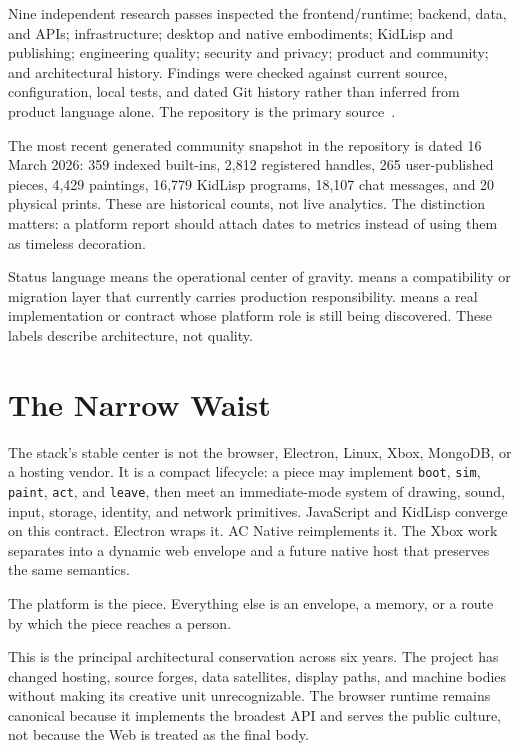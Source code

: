 \documentclass[10pt,letterpaper,twocolumn]{article}
\begin{document}
Nine independent research passes inspected the frontend/runtime; backend, data, and APIs; infrastructure; desktop and native embodiments; KidLisp and publishing; engineering quality; security and privacy; product and community; and architectural history. Findings were checked against current source, configuration, local tests, and dated Git history rather than inferred from product language alone. The repository is the primary source~\citep{acrepo2026}.

The most recent generated community snapshot in the repository is dated 16 March 2026: 359 indexed built-ins, 2,812 registered handles, 265 user-published pieces, 4,429 paintings, 16,779 KidLisp programs, 18,107 chat messages, and 20 physical prints. These are historical counts, not live analytics. The distinction matters: a platform report should attach dates to metrics instead of using them as timeless decoration.

\begin{stackfinding}{Status language}
\canonical{} means the operational center of gravity. \transitional{} means a compatibility or migration layer that currently carries production responsibility. \experimental{} means a real implementation or contract whose platform role is still being discovered. These labels describe architecture, not quality.
\end{stackfinding}

\section{The Narrow Waist}

The stack's stable center is not the browser, Electron, Linux, Xbox, MongoDB, or a hosting vendor. It is a compact lifecycle: a piece may implement \texttt{boot}, \texttt{sim}, \texttt{paint}, \texttt{act}, and \texttt{leave}, then meet an immediate-mode system of drawing, sound, input, storage, identity, and network primitives. JavaScript and KidLisp converge on this contract. Electron wraps it. AC Native reimplements it. The Xbox work separates into a dynamic web envelope and a future native host that preserves the same semantics.

\begin{stackpull}
The platform is the piece. Everything else is an envelope, a memory, or a route by which the piece reaches a person.
\end{stackpull}

This is the principal architectural conservation across six years. The project has changed hosting, source forges, data satellites, display paths, and machine bodies without making its creative unit unrecognizable. The browser runtime remains canonical because it implements the broadest API and serves the public culture, not because the Web is treated as the final body.
\end{document}

